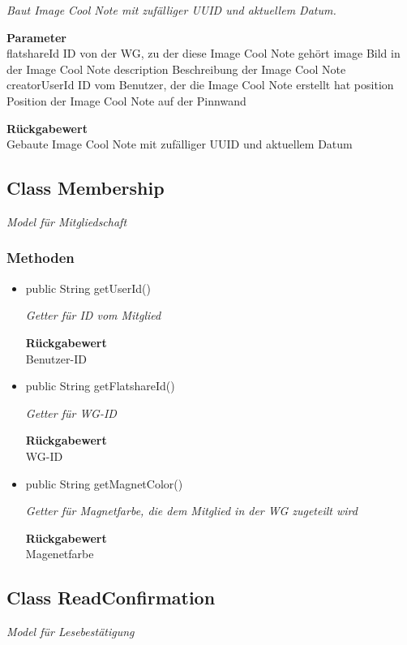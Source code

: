 \documentclass[a4paper]{scrreprt}
\begin{document}
\begin{itemize}
    	\textit{Baut Image Cool Note mit zufälliger UUID und aktuellem Datum.}
    	
    	\textbf{Parameter} \\
    	flatshareId ID von der WG, zu der diese Image Cool Note gehört
    	image Bild in der Image Cool Note
    	description Beschreibung der Image Cool Note
    	creatorUserId ID vom Benutzer, der die Image Cool Note erstellt hat
    	position Position der Image Cool Note auf der Pinnwand
    	
    	\textbf{Rückgabewert} \\
    	Gebaute Image Cool Note mit zufälliger UUID und aktuellem Datum
    \end{itemize}
    \subsection{Class Membership}
    \textit{Model für Mitgliedschaft}
    \subsubsection{Methoden}
    \begin{itemize}
    	\item{public String getUserId()}
    	
    	\textit{Getter für ID vom Mitglied}
    	
    	
    	
    	\textbf{Rückgabewert} \\
    	Benutzer-ID        \item{public String getFlatshareId()}
    	
    	\textit{Getter für WG-ID}
    	
    	
    	
    	\textbf{Rückgabewert} \\
    	WG-ID        \item{public String getMagnetColor()}
    	
    	\textit{Getter für Magnetfarbe, die dem Mitglied in der WG zugeteilt wird}
    	
    	
    	
    	\textbf{Rückgabewert} \\
    	Magenetfarbe
    \end{itemize}
    \subsection{Class ReadConfirmation}
    \textit{Model für Lesebestätigung}
\end{document}
